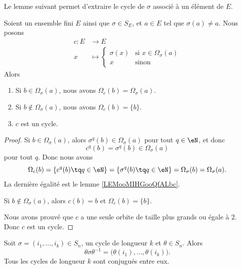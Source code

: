 Le lemme suivant permet d'extraire le cycle de \( \sigma\) associé à un élément de \( E\).
\begin{lemma}        \label{LEMooFFTBooCZsaFu}
	Soient un ensemble fini \( E\) ainsi que \( \sigma\in S_E\), et \( a\in E\) tel que \( \sigma(a)\neq a\). Nous posons
	\begin{equation}
		\begin{aligned}
			c\colon E & \to E                                                  \\
			x         & \mapsto \begin{cases}
				                    \sigma(x) & \text{si } x\in \Omega_{\sigma}(a) \\
				                    x         & \text{sinon }
			                    \end{cases}
		\end{aligned}
	\end{equation}
	Alors
	\begin{enumerate}
		\item
		      Si \( b\in \Omega_{\sigma}(a)\), nous avons \( \Omega_{c}(b)=\Omega_{\sigma}(a)\).
		\item
		      Si \( b\notin \Omega_{\sigma}(a)\), nous avons \( \Omega_{c}(b)=\{ b \}\).
		\item
		      \( c\) est un cycle.
	\end{enumerate}
\end{lemma}

\begin{proof}
	Si \( b\in \Omega_{\sigma}(a)\), alors \( \sigma^q(b)\in \Omega_{\sigma}(a)\) pour tout \( q\in \eN\), et donc
	\begin{equation}
		c^q(b)=\sigma^q(b)\in\Omega_{\sigma}(a)
	\end{equation}
	pour tout \( q\). Donc nous avons
	\begin{equation}
		\Omega_c(b)=\{ c^q(b)\tq q\in \eN \}=\{ \sigma^q(b)\tq q\in \eN \}=\Omega_{\sigma}(b)=\Omega_{\sigma}(a).
	\end{equation}
	La dernière égalité est le lemme \ref{LEMooMIHGooQfALbc}.

	Si \( b\notin\Omega_{\sigma}(a)\), alors \( c(b)=b\) et \( \Omega_c(b)=\{ b \}\).

	Nous avons prouvé que \( c\) a une seule orbite de taille plus grands ou égale à \( 2\). Donc \( c\) est un cycle.
\end{proof}



\begin{lemma}        \label{LemmvZFWP}
	Soit \( \sigma=(i_1,\ldots, i_k)\in S_n\), un cycle de longueur \( k\) et \( \theta\in S_n\). Alors
	\begin{equation}
		\theta\sigma\theta^{-1}=\big( \theta(i_1),\ldots, \theta(i_k) \big).
	\end{equation}
	Tous les cycles de longueur \( k\) sont conjugués entre eux.
\end{lemma}

